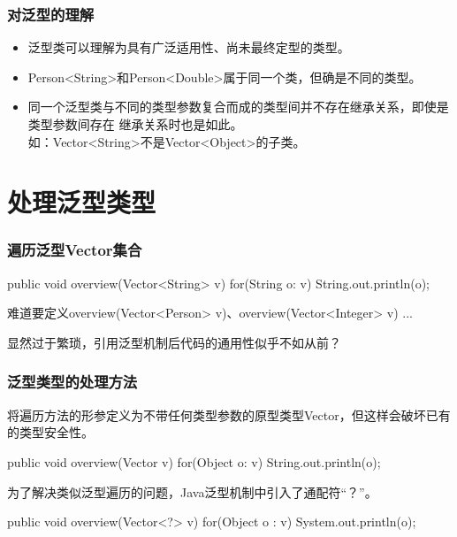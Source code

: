 \begin{frame}[fragile] %
  \frametitle{对泛型的理解}
  
  \begin{itemize}
  \item 泛型类可以理解为具有广泛适用性、尚未最终定型的类型。
  \item Person<String>和Person<Double>属于同一个类，但确是不同的类型。
  \item 同一个泛型类与不同的类型参数复合而成的类型间并不存在继承关系，即使是类型参数间存在
    继承关系时也是如此。\\
    {\kai 如：Vector<String>不是Vector<Object>的子类。}
  \end{itemize}
\end{frame}

\section{处理泛型类型}

\begin{frame}[fragile] %
  \frametitle{遍历泛型Vector集合}

  
  \begin{javaCode}
    public void overview(Vector<String> v) {
      for(String o: v) {
        String.out.println(o);
      }
    }
  \end{javaCode}

  \pause


  难道要定义overview(Vector<Person> v)、overview(Vector<Integer> v) ...
  
  显然过于繁琐，引用泛型机制后代码的通用性似乎不如从前？
\end{frame}

\begin{frame}[fragile] %
  \frametitle{泛型类型的处理方法}


  将遍历方法的形参定义为不带任何类型参数的原型类型Vector，但这样会破坏已有的类型安全性。

  \begin{javaCode}
    public void overview(Vector v) {
      for(Object o: v) {
        String.out.println(o);
      }
    }
  \end{javaCode}

  \pause
  

  为了解决类似泛型遍历的问题，Java泛型机制中引入了通配符“？”。

  \begin{javaCode}
    public void overview(Vector<?> v) {
      for(Object o : v) {
        System.out.println(o);
      }
    }
  \end{javaCode}
\end{frame}

